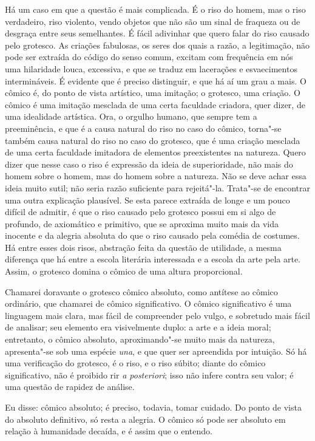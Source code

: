 Há um caso em que a questão é mais complicada. É o riso do homem, mas o
riso verdadeiro, riso violento, vendo objetos que não são um sinal de
fraqueza ou de desgraça entre seus semelhantes. É fácil adivinhar que
quero falar do riso causado pelo grotesco. As criações fabulosas, os
seres dos quais a razão, a legitimação, não pode ser extraída do código
do senso comum, excitam com frequência em nós uma hilaridade louca,
excessiva, e que se traduz em lacerações e esvaecimentos intermináveis.
É evidente que é preciso distinguir, e que há aí um grau a mais. O
cômico é, do ponto de vista artístico, uma imitação; o grotesco, uma
criação. O cômico é uma imitação mesclada de uma certa faculdade
criadora, quer dizer, de uma idealidade artística. Ora, o orgulho
humano, que sempre tem a preeminência, e que é a causa natural do riso
no caso do cômico, torna"-se também causa natural do riso no caso do
grotesco, que é uma criação mesclada de uma certa faculdade imitadora
de elementos preexistentes na natureza. Quero dizer que nesse caso o
riso é expressão da ideia de superioridade, não mais do homem sobre o
homem, mas do homem sobre a natureza. Não se deve achar essa ideia
muito sutil; não seria razão suficiente para rejeitá"-la. Trata"-se de
encontrar uma outra explicação plausível. Se esta parece extraída de
longe e um pouco difícil de admitir, é que o riso causado pelo grotesco
possui em si algo de profundo, de axiomático e primitivo, que se
aproxima muito mais da vida inocente e da alegria absoluta do que o
riso causado pela comédia de costumes. Há entre esses dois risos,
abstração feita da questão de utilidade, a mesma diferença que há entre
a escola literária interessada e a escola da arte pela arte. Assim, o
grotesco domina o cômico de uma altura proporcional.

Chamarei doravante o grotesco cômico absoluto, como antítese ao cômico
ordinário, que chamarei de cômico significativo. O cômico significativo
é uma linguagem mais clara, mas fácil de compreender pelo vulgo, e
sobretudo mais fácil de analisar; seu elemento era visivelmente duplo:
a arte e a ideia moral; entretanto, o cômico absoluto, aproximando"-se
muito mais da natureza, apresenta"-se sob uma espécie \textit{una}, e
que quer ser apreendida por intuição. Só há uma verificação do
grotesco, é o riso, e o riso súbito; diante do cômico significativo,
não é proibido rir \textit{a posteriori}; isso não infere contra seu
valor; é uma questão de rapidez de análise.

Eu disse: cômico absoluto; é preciso, todavia, tomar cuidado. Do ponto
de vista do absoluto definitivo, só resta a alegria. O cômico só pode
ser absoluto em relação à humanidade decaída, e é assim que o entendo.


